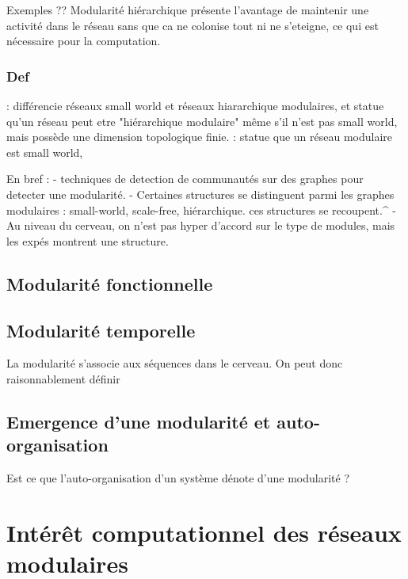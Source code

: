Exemples ?? \cite{Meunier2010ModularAH}
Modularité hiérarchique présente l'avantage de maintenir une activité dans le réseau sans que ca ne colonise tout ni ne s'eteigne, ce qui est nécessaire pour la computation. 




\subsubsection{Def}
\cite{Hilgetag2015IsTB} : différencie réseaux small world et réseaux hiararchique modulaires, et statue qu'un réseau peut etre "hiérarchique modulaire" même s'il n'est pas small world, mais possède une dimension topologique finie. 
\cite{Meunier2010ModularAH} : statue que un réseau modulaire est small world,


En bref : 
- techniques de detection de communautés sur des graphes pour detecter une modularité.
- Certaines structures se distinguent parmi les graphes modulaires :  small-world, scale-free, hiérarchique. ces structures se recoupent.^
- Au niveau du cerveau, on n'est pas hyper d'accord sur le type de modules, mais les expés montrent une structure. 

\subsection{Modularité fonctionnelle}


\subsection{Modularité temporelle}

La modularité s'associe aux séquences dans le cerveau. On peut donc raisonnablement définir 

\subsection{Emergence d'une modularité et auto-organisation}

Est ce que l'auto-organisation d'un système dénote d'une modularité ? 


\section{Intérêt computationnel des réseaux modulaires}

